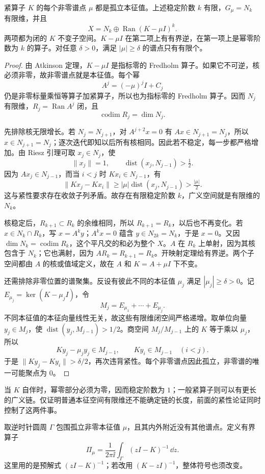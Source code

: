 \begin{theorem}[紧算子的非零谱与广义分解]
紧算子 $K$ 的每个非零谱点 $\mu$ 都是孤立本征值。上述稳定阶数 $k$ 有限，$G_\mu=N_k$ 有限维，并且
\[
X=N_k\oplus\operatorname{Ran}(K-\mu I)^k.
\]
两项都为闭的 $K$ 不变子空间。$K-\mu I$ 在第二项上有有界逆，在第一项上是幂零阶数为 $k$ 的算子。对任意 $\delta>0$，满足 $|\mu|\ge\delta$ 的谱点只有有限个。
\end{theorem}
\begin{proof}
由 Atkinson 定理，$K-\mu I$ 是指标零的 Fredholm 算子。如果它不可逆，核必须非零，故非零谱点就是本征值。每个幂
\[
A^j=(-\mu)^jI+C_j
\]
仍是非零标量乘恒等算子加紧算子，所以也为指标零的 Fredholm 算子。因而 $N_j$ 有限维，$R_j=\operatorname{Ran}A^j$ 闭，且
\[
\operatorname{codim}R_j=\dim N_j.
\]

先排除核无限增长。若 $N_j=N_{j+1}$，对 $A^{j+2}x=0$ 有 $Ax\in N_{j+1}=N_j$，所以 $x\in N_{j+1}=N_j$；逐次迭代即知以后所有核相同。因此若不稳定，每一步都严格增加。由 Riesz 引理可取 $x_j\in N_j$，使
\[
\|x_j\|=1,\qquad\operatorname{dist}(x_j,N_{j-1})>\tfrac12.
\]
因为 $Ax_j\in N_{j-1}$，而当 $i<j$ 时 $Kx_i\in N_{j-1}$，有
\[
\|Kx_j-Kx_i\|
\ge|\mu|\operatorname{dist}(x_j,N_{j-1})>\tfrac{|\mu|}{2}.
\]
这与紧性要求存在收敛子列矛盾。故存在有限稳定阶数 $k$，广义空间就是有限维的 $N_k$。

核稳定后，$R_{k+1}\subset R_k$ 的余维相同，所以 $R_{k+1}=R_k$，以后也不再变化。若 $x\in N_k\cap R_k$，写 $x=A^ky$；$A^kx=0$ 蕴含 $y\in N_{2k}=N_k$，于是 $x=0$。又因 $\dim N_k=\operatorname{codim}R_k$，这个平凡交的和必为整个 $X$。$A$ 在 $R_k$ 上单射，因为其核包含于 $N_k$；它也满射，因为 $AR_k=R_{k+1}=R_k$。开映射定理给有界逆。两个子空间都由 $A$ 的核或值域定义，故在 $A$ 和 $K=A+\mu I$ 下不变。

还需排除非零位置的谱聚集。反设有彼此不同的本征值 $\mu_j$ 满足 $|\mu_j|\ge\delta>0$。记 $E_{\mu_j}=\ker(K-\mu_jI)$，令
\[
M_j=E_{\mu_1}+\cdots+E_{\mu_j}.
\]
不同本征值的本征向量线性无关，故这些有限维闭空间严格递增。取单位向量 $y_j\in M_j$，使 $\operatorname{dist}(y_j,M_{j-1})>1/2$。商空间 $M_j/M_{j-1}$ 上的 $K$ 等于乘以 $\mu_j$，所以
\[
Ky_j-\mu_jy_j\in M_{j-1},\qquad
Ky_i\in M_{j-1}\quad(i<j).
\]
于是 $\|Ky_j-Ky_i\|>\delta/2$，再次违背紧性。每个非零谱点因此孤立，非零谱的唯一可能聚点为 $0$。
\end{proof}

当 $K$ 自伴时，幂零部分必须为零，因而稳定阶数为 $1$；一般紧算子则可以有更长的广义链。仅证明普通本征空间有限维还不能确定链的长度，前面的紧性论证同时控制了这两件事。

\begin{definition}[Riesz 投影]
取逆时针圆周 $\Gamma$ 包围孤立非零本征值 $\mu$，且其内外附近没有其他谱点。定义有界算子
\[
\Pi_\mu=\frac1{2\pi\ii}
\int_\Gamma(zI-K)^{-1}\,\dd z.
\]
这里用的是预解式 $(zI-K)^{-1}$；若改用 $(K-zI)^{-1}$，整体符号也须改变。
\end{definition}

